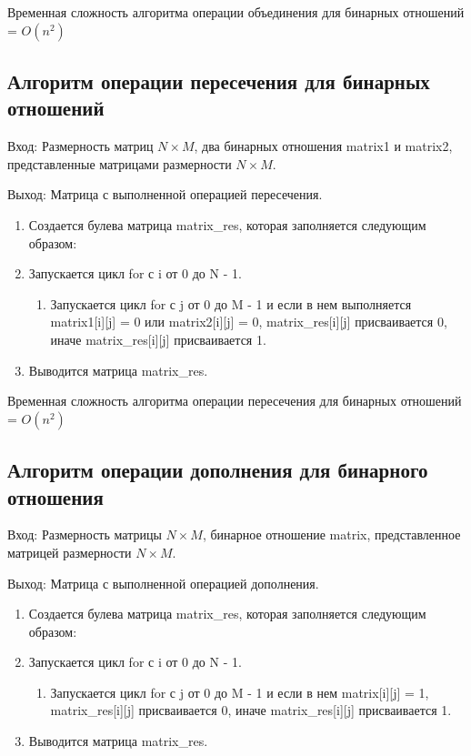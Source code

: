\documentclass[bachelor, och, labwork]{shiza}
\begin{document}
	Временная сложность алгоритма операции объединения для бинарных отношений = $O(n^2)$	
	
	\subsection{Алгоритм операции пересечения для бинарных отношений}

		$\textit{Вход:}$ Размерность матриц $N \times M$, два бинарных отношения matrix1 и matrix2, представленные матрицами размерности $N \times M$.

		$\textit{Выход:}$  Матрица с выполненной операцией пересечения.
		
	\begin{enumerate} 
		\item Создается булева матрица matrix\_res, которая заполняется следующим образом:
		\item Запускается цикл for с i от 0 до N - 1.
		\begin{enumerate} 
			\item Запускается цикл for с j от 0 до M - 1 и если в нем выполняется matrix1[i][j] = 0 или
			matrix2[i][j] = 0, matrix\_res[i][j] присваивается 0, иначе matrix\_res[i][j] присваивается 1.
		\end{enumerate}
		\item Выводится матрица matrix\_res.
	\end{enumerate} 
	
	Временная сложность алгоритма операции пересечения для бинарных отношений = $O(n^2)$

	\subsection{Алгоритм операции дополнения для бинарного отношения}
	
		$\textit{Вход:}$ Размерность матрицы $N \times M$, бинарное отношение matrix, представленное матрицей размерности $N \times M$.

		$\textit{Выход:}$  Матрица с выполненной операцией дополнения.	
	
	\begin{enumerate} 
		\item Создается булева матрица matrix\_res, которая заполняется следующим образом:
		\item Запускается цикл for с i от 0 до N - 1.
		\begin{enumerate} 
			\item Запускается цикл for с j от 0 до M - 1 и если в нем  matrix[i][j] = 1, matrix\_res[i][j] присваивается 0, иначе matrix\_res[i][j] присваивается 1.
		\end{enumerate}
		\item Выводится матрица matrix\_res.
	\end{enumerate} 
	
\end{document}
